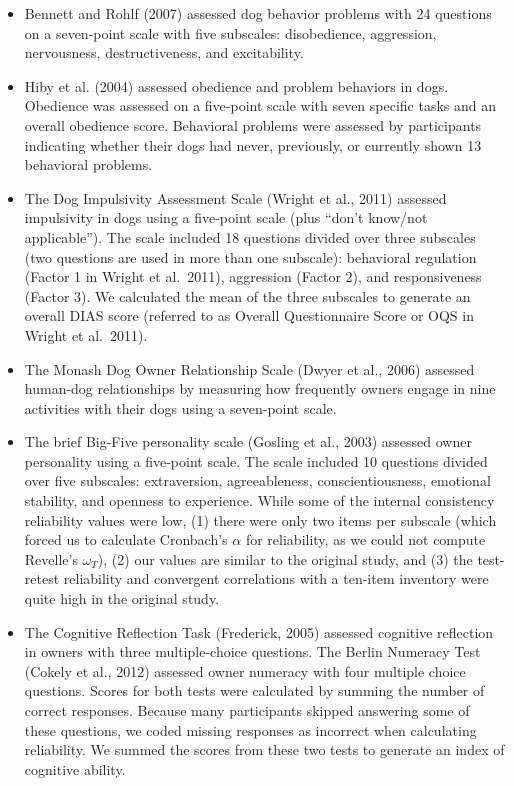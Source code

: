 \documentclass[
  pub,floatsintext]{apa6}
\providecommand{\tightlist}{%
  \setlength{\itemsep}{0pt}\setlength{\parskip}{0pt}}
\begin{document}
\begin{itemize}
\tightlist
\item
  Bennett and Rohlf (2007) assessed dog behavior problems with 24 questions on a seven-point scale with five subscales: disobedience, aggression, nervousness, destructiveness, and excitability.
\item
  Hiby et al. (2004) assessed obedience and problem behaviors in dogs. Obedience was assessed on a five-point scale with seven specific tasks and an overall obedience score. Behavioral problems were assessed by participants indicating whether their dogs had never, previously, or currently shown 13 behavioral problems.
\item
  The Dog Impulsivity Assessment Scale (Wright et al., 2011) assessed impulsivity in dogs using a five-point scale (plus ``don't know/not applicable''). The scale included 18 questions divided over three subscales (two questions are used in more than one subscale): behavioral regulation (Factor 1 in Wright et al.~2011), aggression (Factor 2), and responsiveness (Factor 3). We calculated the mean of the three subscales to generate an overall DIAS score (referred to as Overall Questionnaire Score or OQS in Wright et al.~2011).
\item
  The Monash Dog Owner Relationship Scale (Dwyer et al., 2006) assessed human-dog relationships by measuring how frequently owners engage in nine activities with their dogs using a seven-point scale.
\item
  The brief Big-Five personality scale (Gosling et al., 2003) assessed owner personality using a five-point scale. The scale included 10 questions divided over five subscales: extraversion, agreeableness, conscientiousness, emotional stability, and openness to experience. While some of the internal consistency reliability values were low, (1) there were only two items per subscale (which forced us to calculate Cronbach's \(\alpha\) for reliability, as we could not compute Revelle's \(\omega_{T}\)), (2) our values are similar to the original study, and (3) the test-retest reliability and convergent correlations with a ten-item inventory were quite high in the original study.
\item
  The Cognitive Reflection Task (Frederick, 2005) assessed cognitive reflection in owners with three multiple-choice questions. The Berlin Numeracy Test (Cokely et al., 2012) assessed owner numeracy with four multiple choice questions. Scores for both tests were calculated by summing the number of correct responses. Because many participants skipped answering some of these questions, we coded missing responses as incorrect when calculating reliability. We summed the scores from these two tests to generate an index of cognitive ability.
\end{itemize}
\end{document}

